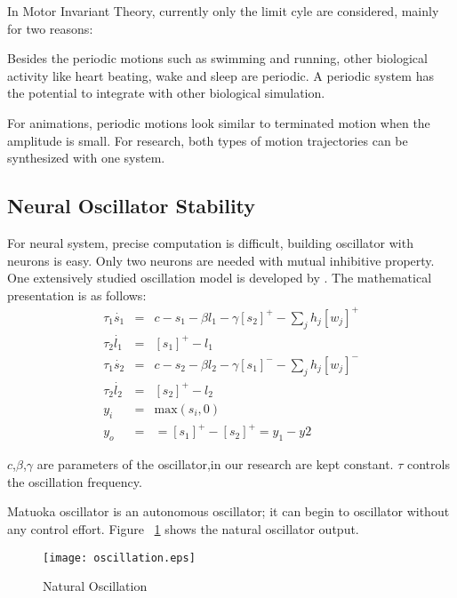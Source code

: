 In Motor Invariant Theory, currently only the limit cyle are considered, mainly for two reasons: 
\begin{itemize}
Besides the periodic motions such as swimming and running, other biological activity like heart beating, wake and sleep  are periodic.
A periodic system has the potential to integrate with other biological simulation.

For animations, periodic motions look similar to terminated motion when the amplitude is small. 
For \cms research, both types of motion trajectories can be synthesized with one system.
\end{itemize}

\subsection{Neural Oscillator Stability}
For neural system, precise computation is difficult,  building oscillator with neurons is easy. 
Only two neurons are needed with mutual inhibitive property.
One extensively studied oscillation model is developed by \citet{neurooscillation}. 
The mathematical presentation is as follows:
\begin{eqnarray}
\tau_{1} \dot{s_{1}}&=&c-s_{1}-\beta l_{1}-\gamma [s_{2}]^{+}-\sum_{j}h_{j}[w_{j}]^{+}\\
\tau_{2} \dot{l_{1}}&=&[s_{1}]^{+}-l_{1}\\
\tau_{1} \dot{s_{2}}&=&c-s_{2}-\beta l_{2}-\gamma [s_{1}]^{-}-\sum_{j}h_{j}[w_{j}]^{-}\\
\tau_{2} \dot{l_{2}}&=&[s_{2}]^{+}-l_{2}\\
y_{i}&=&\mbox{max}(s_{i},0)\\
y_{o}&=&=[s_{1}]^{+}-[s_{2}]^{+}=y_{1}-y{2}
\label{eq:matsuta}
\end{eqnarray}

$c$,$\beta$,$\gamma$ are parameters of the oscillator,in our research are kept constant.
$\tau$ controls the oscillation frequency.







Matuoka oscillator is an autonomous oscillator; 
it can begin to oscillator without any control effort.
Figure ~\ref{fig:natural-oscilation} shows the natural oscillator output.
\begin{figure}[h]
\texttt{[image: oscillation.eps]}
\caption{Natural Oscillation}
\label{fig:natural-oscilation}
\end{figure}





